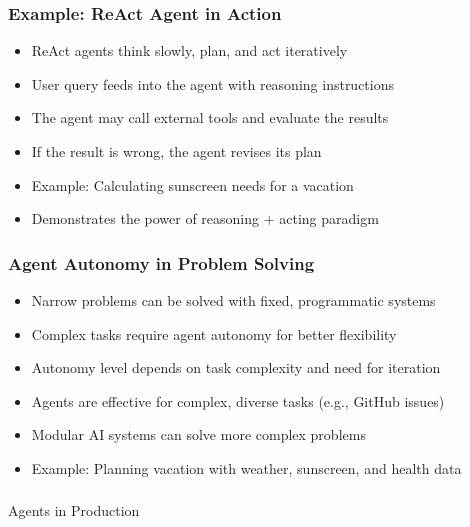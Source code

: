 \begin{frame}[fragile]\frametitle{Example: ReAct Agent in Action}
\begin{itemize}
    \item ReAct agents think slowly, plan, and act iteratively
    \item User query feeds into the agent with reasoning instructions
    \item The agent may call external tools and evaluate the results
    \item If the result is wrong, the agent revises its plan
    \item Example: Calculating sunscreen needs for a vacation
    \item Demonstrates the power of reasoning + acting paradigm
\end{itemize}
\end{frame}

\begin{frame}[fragile]\frametitle{Agent Autonomy in Problem Solving}
\begin{itemize}
    \item Narrow problems can be solved with fixed, programmatic systems
    \item Complex tasks require agent autonomy for better flexibility
    \item Autonomy level depends on task complexity and need for iteration
    \item Agents are effective for complex, diverse tasks (e.g., GitHub issues)
    \item Modular AI systems can solve more complex problems
    \item Example: Planning vacation with weather, sunscreen, and health data
\end{itemize}
\end{frame}

\begin{frame}[fragile]\frametitle{}
\begin{center}
{\Large Agents in Production}
\end{center}
\end{frame}

